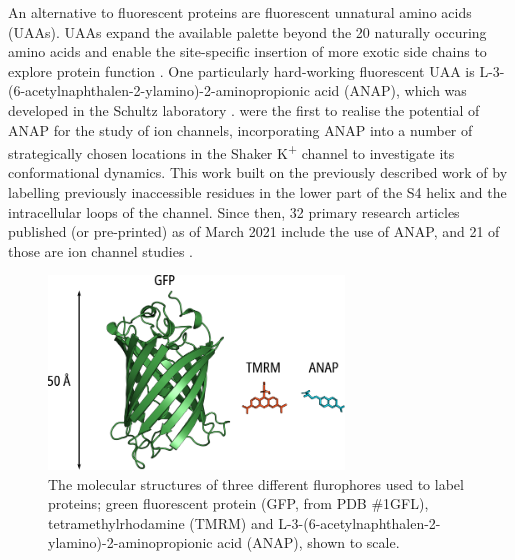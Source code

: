 An alternative to fluorescent proteins are fluorescent unnatural amino acids (UAAs).
UAAs expand the available palette beyond the 20 naturally occuring amino acids and enable the site-specific insertion of more exotic side chains to explore protein function \cite{pless_unnatural_2013, zheng_handbook_2015, cowgill_contribution_2019, braun_current_2020, puljung_anap_2021}.
One particularly hard-working fluorescent UAA is L-3-(6-acetylnaphthalen-2-ylamino)-2-aminopropionic acid (ANAP), which was developed in the Schultz laboratory \cite{lee_genetic_2009, chatterjee_genetically_2013}.
\citeauthor{kalstrup_dynamics_2013} were the first to realise the potential of ANAP for the study of ion channels, incorporating ANAP into a number of strategically chosen locations in the Shaker K\textsuperscript{+} channel to investigate its conformational dynamics.
This work built on the previously described work of \citeauthor{cha_characterizing_1997} by labelling previously inaccessible residues in the lower part of the S4 helix and the intracellular loops of the channel.
Since then, 32 primary research articles published (or pre-printed) as of March 2021 include the use of ANAP, and 21 of those are ion channel studies \cite{puljung_anap_2021}.

\begin{figure}[h]
	\centering
	\includegraphics[width=0.7\textwidth]{fluorophore_sizes.pdf}
	\caption[Contrasting sizes of flurophores]{
	The molecular structures of three different flurophores used to label proteins; green fluorescent protein (GFP, from PDB \#1GFL), tetramethylrhodamine (TMRM) and L-3-(6-acetylnaphthalen-2-ylamino)-2-aminopropionic acid (ANAP), shown to scale.
	}\label{ch1fig:fluorophore_sizes}
\end{figure}

